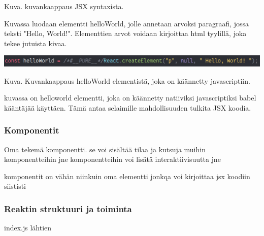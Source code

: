 Kuva\getImgCount .{} kuvankaappaus JSX syntaxista.
\medskip

Kuvassa luodaan elementti helloWorld, jolle annetaan arvoksi paragraafi, jossa teksti "Hello, World!"{}.
Elementtien arvot voidaan kirjoittaa html tyylillä, joka tekee jutuista kivaa.
\medskip



\bigskip
\includegraphics[width=15cm]{src/public/oppar/transpiled_jsx_example.png}

Kuva\getImgCount .{} Kuvankaappaus helloWorld elementistä, joka on käännetty javascriptiin. 
\medskip


kuvassa on helloworld elementti, joka on käännetty natiiviksi javascriptiksi babel kääntäjää käyttäen.
Tämä antaa selaimille mahdollisuuden tulkita JSX koodia.
\medskip



\subsubsection{Komponentit}



Oma tekemä komponentti. se voi sisältää tilaa ja kutsuja muihin komponentteihin jne
komponentteihin voi lisätä interaktiivisuutta jne



komponentit on vähän niinkuin oma elementti jonkqa voi kirjoittaa jsx koodiin siististi

\medskip

\subsubsection{Reaktin struktuuri ja toiminta}


index.js lähtien




